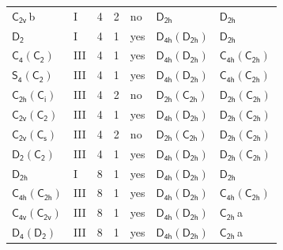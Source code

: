 \documentclass[10pt,a4paper]{article}
\numberwithin{equation}{section}
\newcommand{\grp}[1]{\mathsf{#1}}
\newcommand{\clsletter}[1]{\,{\scriptsize\color{black!55}#1}}
\begin{document}
{\begin{longtable}{@{}llrrlll@{}}
\href{../../../rotation/data/pdf/C2v.pdf}{$\grp{C_{2v}}$}\clsletter{b} & I & 4 & 2 & no & \href{../../../rotation/data/pdf/D2h.pdf}{$\grp{D_{2h}}$} & \href{../../../rotation/data/pdf/D2h.pdf}{$\grp{D_{2h}}$}\\
\href{../../../rotation/data/pdf/D2.pdf}{$\grp{D_{2}}$} & I & 4 & 1 & yes & \href{D4h-D2h.pdf}{$\grp{D_{4h}}(\grp{D_{2h}})$} & \href{../../../rotation/data/pdf/D2h.pdf}{$\grp{D_{2h}}$}\\
\href{C4-C2.pdf}{$\grp{C_{4}}(\grp{C_{2}})$} & III & 4 & 1 & yes & \href{D4h-D2h.pdf}{$\grp{D_{4h}}(\grp{D_{2h}})$} & \href{C4h-C2h.pdf}{$\grp{C_{4h}}(\grp{C_{2h}})$}\\
\href{S4-C2.pdf}{$\grp{S_{4}}(\grp{C_{2}})$} & III & 4 & 1 & yes & \href{D4h-D2h.pdf}{$\grp{D_{4h}}(\grp{D_{2h}})$} & \href{C4h-C2h.pdf}{$\grp{C_{4h}}(\grp{C_{2h}})$}\\
\href{C2h-S2.pdf}{$\grp{C_{2h}}(\grp{C_{i}})$} & III & 4 & 2 & no & \href{D2h-C2h.pdf}{$\grp{D_{2h}}(\grp{C_{2h}})$} & \href{D2h-C2h.pdf}{$\grp{D_{2h}}(\grp{C_{2h}})$}\\
\href{C2v-C2.pdf}{$\grp{C_{2v}}(\grp{C_{2}})$} & III & 4 & 1 & yes & \href{D4h-D2h.pdf}{$\grp{D_{4h}}(\grp{D_{2h}})$} & \href{D2h-C2h.pdf}{$\grp{D_{2h}}(\grp{C_{2h}})$}\\
\href{C2v-C1v.pdf}{$\grp{C_{2v}}(\grp{C_{s}})$} & III & 4 & 2 & no & \href{D2h-C2h.pdf}{$\grp{D_{2h}}(\grp{C_{2h}})$} & \href{D2h-C2h.pdf}{$\grp{D_{2h}}(\grp{C_{2h}})$}\\
\href{D2-C2.pdf}{$\grp{D_{2}}(\grp{C_{2}})$} & III & 4 & 1 & yes & \href{D4h-D2h.pdf}{$\grp{D_{4h}}(\grp{D_{2h}})$} & \href{D2h-C2h.pdf}{$\grp{D_{2h}}(\grp{C_{2h}})$}\\
\href{../../../rotation/data/pdf/D2h.pdf}{$\grp{D_{2h}}$} & I & 8 & 1 & yes & \href{D4h-D2h.pdf}{$\grp{D_{4h}}(\grp{D_{2h}})$} & \href{../../../rotation/data/pdf/D2h.pdf}{$\grp{D_{2h}}$}\\
\href{C4h-C2h.pdf}{$\grp{C_{4h}}(\grp{C_{2h}})$} & III & 8 & 1 & yes & \href{D4h-D2h.pdf}{$\grp{D_{4h}}(\grp{D_{2h}})$} & \href{C4h-C2h.pdf}{$\grp{C_{4h}}(\grp{C_{2h}})$}\\
\href{C4v-C2v.pdf}{$\grp{C_{4v}}(\grp{C_{2v}})$} & III & 8 & 1 & yes & \href{D4h-D2h.pdf}{$\grp{D_{4h}}(\grp{D_{2h}})$} & \href{../../../rotation/data/pdf/C2h.pdf}{$\grp{C_{2h}}$}\clsletter{a}\\
\href{D4-D2.pdf}{$\grp{D_{4}}(\grp{D_{2}})$} & III & 8 & 1 & yes & \href{D4h-D2h.pdf}{$\grp{D_{4h}}(\grp{D_{2h}})$} & \href{../../../rotation/data/pdf/C2h.pdf}{$\grp{C_{2h}}$}\clsletter{a}\\

\end{longtable}}
\end{document}
